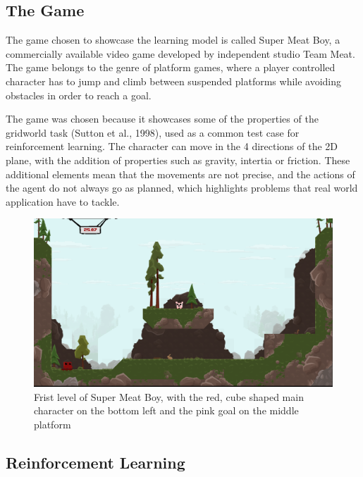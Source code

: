 \documentclass[10pt]{article}
\begin{document}
    \subsection{The Game}

    The game chosen to showcase the learning model is called Super Meat Boy, a commercially available video game developed by independent studio Team Meat. The game belongs to the genre of platform games, where a player controlled character has to jump and climb between suspended platforms while avoiding obstacles in order to reach a goal.   

    The game was chosen because it showcases some of the properties of the gridworld task (Sutton et al., 1998), used as a common test case for reinforcement learning. The character can move in the 4 directions of the 2D plane, with the addition of properties such as gravity, intertia or friction. These additional elements mean that the movements are not precise, and the actions of the agent do not always go as planned, which highlights problems that real world application have to tackle.

    \begin{figure}
    \center
    \includegraphics[width=130mm]{./level1.png}
    \caption{Frist level of Super Meat Boy, with the red, cube shaped main character on the bottom left and the pink goal on the middle platform}
    \end{figure}

    \subsection{Reinforcement Learning}
\end{document}
